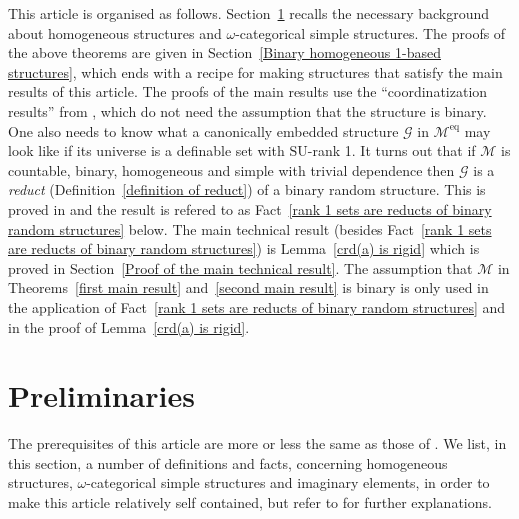 \documentclass[11pt, twoside]{amsart}
\numberwithin{equation}{section}
\newcommand{\su}{\mathrm{SU}}
\newcommand{\meq}{^{\mathrm{eq}}}
\newcommand{\mcG}{\mathcal{G}}
\newcommand{\mcM}{\mathcal{M}}
\begin{document}
This article is organised as follows.
Section~\ref{Preliminaries} recalls the necessary background about homogeneous structures and $\omega$-categorical simple structures.
The proofs of the above theorems are given in Section~\ref{Binary homogeneous 1-based structures},
which ends with a recipe for making structures that satisfy the main results of this article.
The proofs of the main results use the ``coordinatization results'' from \cite{Djo06},
which do not need the assumption that the structure is binary.
One also needs to know what 
a canonically embedded structure $\mcG$ in $\mcM\meq$ may look like if its universe is
a definable set with $\su$-rank 1. It turns out that if $\mcM$ is countable, binary, homogeneous and simple with trivial
dependence then $\mcG$ is a {\em reduct} (Definition~\ref{definition of reduct}) of a binary random structure. 
This is proved in \cite{AK14} and the result is refered to as Fact~\ref{rank 1 sets are reducts of binary random structures} below.
The main technical result (besides Fact~\ref{rank 1 sets are reducts of binary random structures}) is
Lemma~\ref{crd(a) is rigid} which is proved in Section~\ref{Proof of the main technical result}.
The assumption that $\mcM$ in Theorems~\ref{first main result} and~\ref{second main result}
is binary is only used in the application of Fact~\ref{rank 1 sets are reducts of binary random structures}
and in the proof of Lemma~\ref{crd(a) is rigid}.





























\section{Preliminaries}\label{Preliminaries}

\noindent
The prerequisites of this article are more or less the same as those of \cite{AK14}.
We list, in this section, a number of definitions and facts, concerning homogeneous structures, $\omega$-categorical simple
structures and imaginary elements, in order to make this article relatively self contained,
but refer to \cite{AK14} for further explanations.
\end{document}
